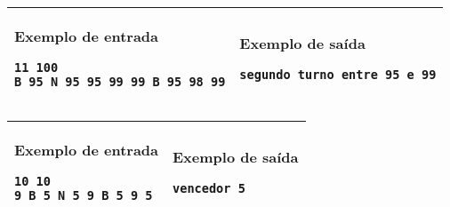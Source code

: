 \begin{table}[!h]
\centering
\begin{tabular}{|l|l|}
\hline
\begin{minipage}[t]{3in}
\textbf{Exemplo de entrada}
\begin{verbatim}
11 100
B 95 N 95 95 99 99 B 95 98 99
\end{verbatim}
\vspace{1mm}
\end{minipage}
&
\begin{minipage}[t]{3in}
\textbf{Exemplo de saída}
\begin{verbatim}
segundo turno entre 95 e 99
\end{verbatim}
\vspace{1mm}
\end{minipage} \\
\hline
\end{tabular}
\end{table}

\begin{table}[!h]
\centering
\begin{tabular}{|l|l|}
\hline
\begin{minipage}[t]{3in}
\textbf{Exemplo de entrada}
\begin{verbatim}
10 10
9 B 5 N 5 9 B 5 9 5
\end{verbatim}
\vspace{1mm}
\end{minipage}
&
\begin{minipage}[t]{3in}
\textbf{Exemplo de saída}
\begin{verbatim}
vencedor 5
\end{verbatim}
\vspace{1mm}
\end{minipage} \\
\hline
\end{tabular}
\end{table}
